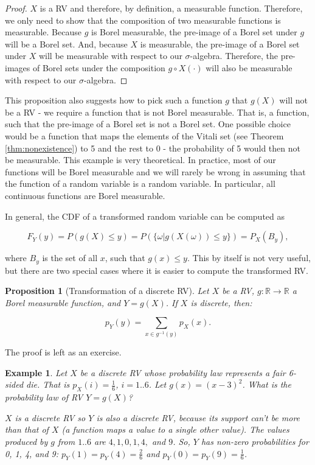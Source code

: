 \documentclass{book}
\theoremstyle{plain}%
\newtheorem{prototheorem}{Example}[section]
\newenvironment{cexample}
   {\colorlet{shadecolor}{gray!10}\begin{shaded}\begin{prototheorem}}
   {\end{prototheorem}\end{shaded}}
\newtheorem{proposition}{Proposition}[section]
\theoremstyle{definition}
\newlength{\arrow}
\begin{document}
\begin{proof}
$X$ is a RV and therefore, by definition, a measurable function. Therefore, we only need to show that the composition of two measurable functions is measurable. Because $g$ is Borel measurable, the pre-image of a Borel set under $g$ will be a Borel set. And, because $X$ is measurable, the pre-image of a Borel set under $X$ will be measurable with respect to our $\sigma$-algebra. Therefore, the pre-images of Borel sets under the composition $g \circ X(\cdot)$ will also be measurable with respect to our $\sigma$-algebra.
\end{proof}

This proposition also suggests how to pick such a function $g$ that $g(X)$ will not be a RV - we require a function that is not Borel measurable. That is, a function, such that the pre-image of a Borel set is not a Borel set. One possible choice would be a function that maps the elements of the Vitali set (see Theorem \ref{thm:nonexistence}) to 5 and  the rest to 0 - the probability of 5 would then not be measurable. This example is very theoretical. In practice, most of our functions will be Borel measurable and we will rarely be wrong in assuming that the function of a random variable is a random variable. In particular, all continuous functions are Borel measurable.

In general, the CDF of a transformed random variable can be computed as

$$F_Y(y) = P(g(X) \leq y) = P(\{\omega|g(X(\omega)) \leq y\}) = P_X(B_y),$$

where $B_y$ is the set of all $x$, such that $g(x) \leq y$. This by itself is not very useful, but there are two special cases where it is easier to compute the transformed RV.

\begin{proposition}[Transformation of a discrete RV]
Let $X$ be a RV, $g: \mathbb{R} \rightarrow \mathbb{R}$ a Borel measurable function, and $Y = g(X)$. If $X$ is discrete, then: 

$$p_Y(y) = \sum_{x \in g^{-1}(y)} p_X(x).$$\label{prop:transd}
\end{proposition}

The proof is left as an exercise.

\begin{cexample}
Let $X$ be a discrete RV whose probability law represents a fair 6-sided die. That is $p_X(i) = \frac{1}{6}$, $i = 1..6$. Let $g(x) = (x - 3)^2$. What is the probability law of RV $Y = g(X)$?

$X$ is a discrete RV so $Y$ is also a discrete RV, because its support can't be more than that of $X$ (a function maps a value to a single other value). The values produced by $g$ from $1..6$ are $4, 1, 0, 1, 4,$ and $9$. So, $Y$ has non-zero probabilities for 0, 1, 4, and 9: $p_Y(1) = p_Y(4) = \frac{2}{6}$ and $p_Y(0) = p_Y(9) = \frac{1}{6}$.
\end{cexample}
\end{document}

